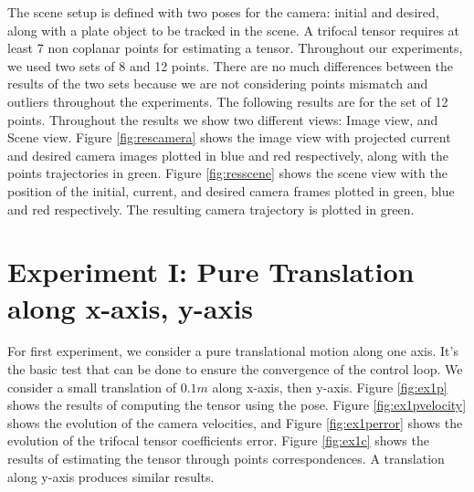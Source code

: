 \newpage
The scene setup is defined with two poses for the camera: initial and desired, along with a plate object to be tracked in the scene. A trifocal tensor requires at least 7 non coplanar points for estimating a tensor. Throughout our experiments, we used two sets of 8 and 12 points. There are no much differences between the results of the two sets because we are not considering points mismatch and outliers throughout the experiments. The following results are for the set of 12 points. Throughout the results we show two different views: Image view, and Scene view. Figure \ref{fig:rescamera} shows the image view with projected current and desired camera images plotted in blue and red respectively, along with the points trajectories in green. Figure \ref{fig:resscene} shows the scene view with the position of the initial, current, and desired camera frames plotted in green, blue and red respectively. The resulting camera trajectory is plotted in green.

\section{Experiment I: Pure Translation along x-axis, y-axis}
For first experiment, we consider a pure translational motion along one axis. It's the basic test that can be done to ensure the convergence of the control loop. We consider a small translation of $0.1m$ along x-axis, then y-axis. Figure \ref{fig:ex1p} shows the results of computing the tensor using the pose.  Figure \ref{fig:ex1pvelocity} shows the evolution of the camera velocities, and Figure \ref{fig:ex1perror} shows the evolution of the trifocal tensor coefficients error. Figure \ref{fig:ex1c} shows the results of estimating the tensor through points correspondences. A translation along y-axis produces similar results.

